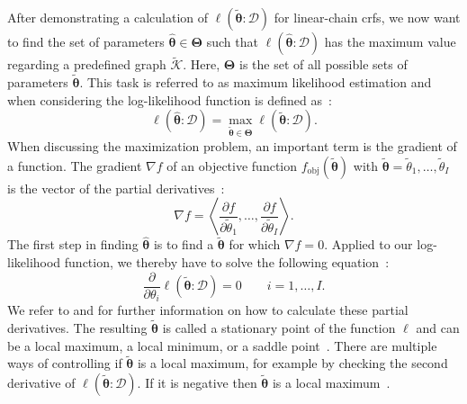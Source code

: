 After demonstrating a calculation of $\ell(\bm{\tilde{\theta}}:\mathcal{D})$ for \glspl{linear-chain crf}, we now want to find the set of parameters $\bm{\hat{\theta}}\in\mathbf{\Theta}$ such that $\ell(\bm{\hat{\theta}}:\mathcal{D})$ has the maximum value regarding a predefined graph $\mathcal{\tilde{K}}$.
Here, $\bm{\Theta}$ is the set of all possible sets of parameters $\bm{\tilde{\theta}}$.
This task is referred to as \gls{maximum likelihood estimation} and when considering the \gls{log-likelihood function} is defined as~\citep{koller2009probabilistic}:
\begin{equation}
  \label{equ:maximum-log-likelihood-estimation}
  \ell\left(\bm{\hat{\theta}}:\mathcal{D}\right)=\max_{\bm{\tilde{\theta}}\in\mathbf{\Theta}}\ell\left(\bm{\tilde{\theta}}:\mathcal{D}\right).
\end{equation}
When discussing the maximization problem, an important term is the \gls{gradient} of a \gls{function}.
The \gls{gradient} $\nabla f$ of an \gls{objective function} $f_{\text{obj}}(\bm{\tilde{\theta}})$ with $\bm{\tilde{\theta}}=\tilde{\theta}_1,\dots,\tilde{\theta}_I$ is the vector of the partial derivatives~\citep{koller2009probabilistic}:
\begin{equation}
  \label{equ:gradient}
  \nabla f=\left\langle\frac{\partial f}{\partial\tilde{\theta}_1},\dots,\frac{\partial f}{\partial\tilde{\theta}_I}\right\rangle.
\end{equation}
The first step in finding $\bm{\hat{\theta}}$ is to find a $\bm{\tilde{\theta}}$ for which $\nabla f=0$.
Applied to our \gls{log-likelihood function}, we thereby have to solve the following equation~\citep{koller2009probabilistic}:
\begin{equation}
  \label{equ:log-likelihood-gradient}
  \frac{\partial}{\partial\theta_i}\ell\left(\bm{\tilde{\theta}}:\mathcal{D}\right)=0\ \ \ \ \ \ \ \ \ i=1,\dots,I.
\end{equation}
We refer to \citet{sutton2010introduction} and \citet{koller2009probabilistic} for further information on how to calculate these partial derivatives.
The resulting $\bm{\tilde{\theta}}$ is called a \gls{stationary point} of the function $\ell$ and can be a local maximum, a local minimum, or a saddle point~\citep{koller2009probabilistic}.
There are multiple ways of controlling if $\bm{\tilde{\theta}}$ is a local maximum, for example by checking the second derivative of $\ell(\bm{\tilde{\theta}}:\mathcal{D})$.
If it is negative then $\bm{\tilde{\theta}}$ is a local maximum~\citep{koller2009probabilistic}.

